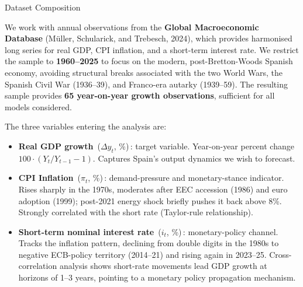 \documentclass[9pt]{beamer}
\begin{document}
\begin{frame}{Dataset Composition}
\label{slide:dataset}
\footnotesize

We work with annual observations from the \textbf{Global Macroeconomic Database} (Müller, Schularick, and Trebesch, 2024), which provides harmonised long series for real GDP, CPI inflation, and a short-term interest rate. We restrict the sample to \textbf{1960--2025} to focus on the modern, post-Bretton-Woods Spanish economy, avoiding structural breaks associated with the two World Wars, the Spanish Civil War (1936--39), and Franco-era autarky (1939--59). The resulting sample provides \textbf{65 year-on-year growth observations}, sufficient for all models considered.

\vspace{0.25cm}

The three variables entering the analysis are:
\begin{itemize}
  \item \textbf{Real GDP growth} \,($\Delta y_t$, \%)\,: target variable. Year-on-year percent change $100 \cdot (Y_t/Y_{t-1}-1)$. Captures Spain's output dynamics we wish to forecast.

  \item \textbf{CPI Inflation} \,($\pi_t$, \%)\,: demand-pressure and monetary-stance indicator. Rises sharply in the 1970s, moderates after EEC accession (1986) and euro adoption (1999); post-2021 energy shock briefly pushes it back above 8\%. Strongly correlated with the short rate (Taylor-rule relationship).

  \item \textbf{Short-term nominal interest rate} \,($i_t$, \%)\,: monetary-policy channel. Tracks the inflation pattern, declining from double digits in the 1980s to negative ECB-policy territory (2014--21) and rising again in 2023--25. Cross-correlation analysis shows short-rate movements lead GDP growth at horizons of 1--3 years, pointing to a monetary policy propagation mechanism.
\end{itemize}

\end{frame}
\end{document}
